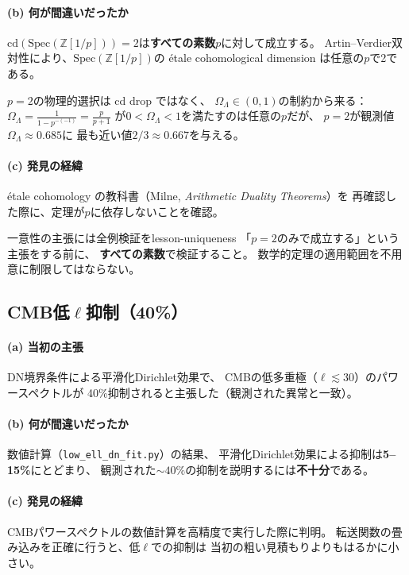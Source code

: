 \documentclass[11pt,a4paper]{article}
\newcommand{\Spec}{\mathrm{Spec}}
\newcommand{\cd}{\mathrm{cd}}
\begin{document}
\paragraph{(b) 何が間違いだったか}
$\cd(\Spec(\mathbb{Z}[1/p])) = 2$は\textbf{すべての素数$p$}に対して成立する。
Artin--Verdier双対性により、$\Spec(\mathbb{Z}[1/p])$の
\'etale cohomological dimension は任意の$p$で2である。

$p = 2$の物理的選択は cd drop ではなく、
$\Omega_\Lambda \in (0,1)$の制約から来る：
$\Omega_\Lambda = \frac{1}{1 - p^{-(-1)}} = \frac{p}{p+1}$
が$0 < \Omega_\Lambda < 1$を満たすのは任意の$p$だが、
$p = 2$が観測値$\Omega_\Lambda \approx 0.685$に
最も近い値$2/3 \approx 0.667$を与える。

\paragraph{(c) 発見の経緯}
\'etale cohomology の教科書（Milne, \emph{Arithmetic Duality Theorems}）を
再確認した際に、定理が$p$に依存しないことを確認。

\begin{keylesson}{一意性の主張には全例検証を}{lesson-uniqueness}
「$p = 2$のみで成立する」という主張をする前に、
\textbf{すべての素数}で検証すること。
数学的定理の適用範囲を不用意に制限してはならない。
\end{keylesson}


\subsection{CMB低$\ell$抑制（40\%）}
\label{sec:15.4}

\paragraph{(a) 当初の主張}
DN境界条件による平滑化Dirichlet効果で、
CMBの低多重極（$\ell \lesssim 30$）のパワースペクトルが
40\%抑制されると主張した（観測された異常と一致）。

\paragraph{(b) 何が間違いだったか}
数値計算（\texttt{low\_ell\_dn\_fit.py}）の結果、
平滑化Dirichlet効果による抑制は\textbf{5--15\%}にとどまり、
観測された$\sim 40\%$の抑制を説明するには\textbf{不十分}である。

\paragraph{(c) 発見の経緯}
CMBパワースペクトルの数値計算を高精度で実行した際に判明。
転送関数の畳み込みを正確に行うと、低$\ell$での抑制は
当初の粗い見積もりよりもはるかに小さい。
\end{document}
